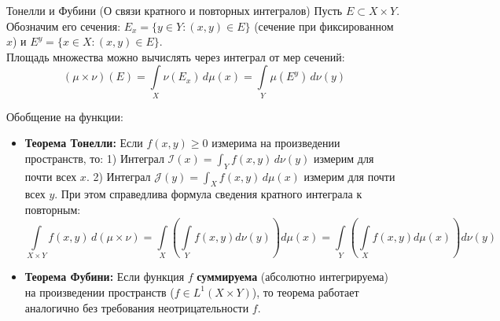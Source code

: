 \documentclass[12pt,a4paper]{article}
\begin{document}
\begin{Theorem}{Тонелли и Фубини (О связи кратного и повторных интегралов)}{}
Пусть $E \subset X \times Y$. Обозначим его сечения:
$E_x = \{ y \in Y : (x,y) \in E \}$ (сечение при фиксированном $x$) и 
$E^y = \{ x \in X : (x,y) \in E \}$. \\
Площадь множества можно вычислять через интеграл от мер сечений:
$$ (\mu \times \nu)(E) = \int\limits_X \nu(E_x) \, d\mu(x) = \int\limits_Y \mu(E^y) \, d\nu(y) $$

Обобщение на функции:
\begin{itemize}
    \item \textbf{Теорема Тонелли:} Если $f(x,y) \ge 0$ измерима на произведении пространств, то:
    1) Интеграл $\mathcal{I}(x) = \int_Y f(x,y) \, d\nu(y)$ измерим для почти всех $x$.
    2) Интеграл $\mathcal{J}(y) = \int_X f(x,y) \, d\mu(x)$ измерим для почти всех $y$.
    При этом справедлива формула сведения кратного интеграла к повторным:
    $$ \int\limits_{X \times Y} f(x,y) \, d(\mu \times \nu) = \int\limits_X \left( \int\limits_Y f(x,y) d\nu(y) \right) d\mu(x) = \int\limits_Y \left( \int\limits_X f(x,y) d\mu(x) \right) d\nu(y) $$
    
    \item \textbf{Теорема Фубини:} Если функция $f$ \textbf{суммируема} (абсолютно интегрируема) на произведении пространств ($f \in L^1(X \times Y)$), то теорема работает аналогично без требования неотрицательности $f$.
\end{itemize}
\end{Theorem}
\end{document}
